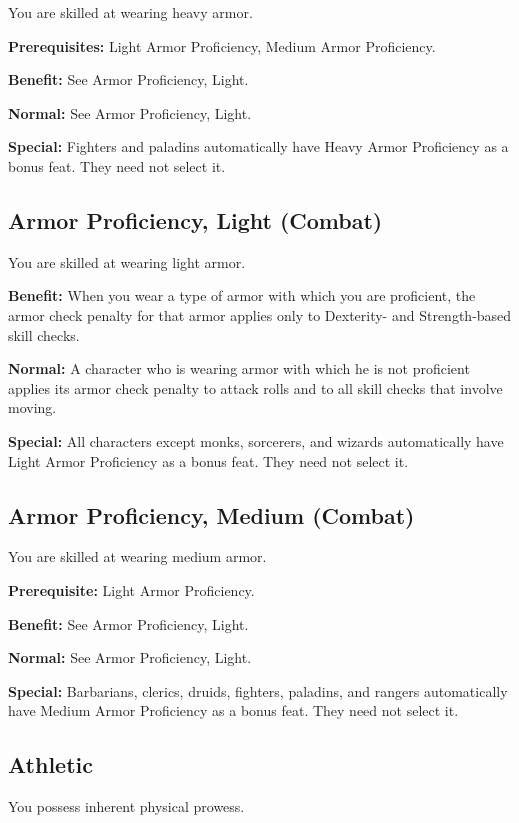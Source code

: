 				
You are skilled at wearing heavy armor.
				
\textbf{Prerequisites:} Light Armor Proficiency, Medium Armor Proficiency.
				
\textbf{Benefit:} See Armor Proficiency, Light.
				
\textbf{Normal:} See Armor Proficiency, Light.
				
\textbf{Special:} Fighters and paladins automatically have Heavy Armor Proficiency as a bonus feat. They need not select it.
				
\subsection{Armor Proficiency, Light (Combat)}

				
You are skilled at wearing light armor.
				
\textbf{Benefit:} When you wear a type of armor with which you are proficient, the armor check penalty for that armor applies only to Dexterity- and Strength-based skill checks.
				
\textbf{Normal:} A character who is wearing armor with which he is not proficient applies its armor check penalty to attack rolls and to all skill checks that involve moving.
				
\textbf{Special:} All characters except monks, sorcerers, and wizards automatically have Light Armor Proficiency as a bonus feat. They need not select it.
				
\subsection{Armor Proficiency, Medium (Combat)}

				
You are skilled at wearing medium armor.
				
\textbf{Prerequisite:} Light Armor Proficiency.
				
\textbf{Benefit:} See Armor Proficiency, Light.
				
\textbf{Normal:} See Armor Proficiency, Light.
				
\textbf{Special:} Barbarians, clerics, druids, fighters, paladins, and rangers automatically have Medium Armor Proficiency as a bonus feat. They need not select it.
				
\subsection{Athletic}

				
You possess inherent physical prowess.
				
